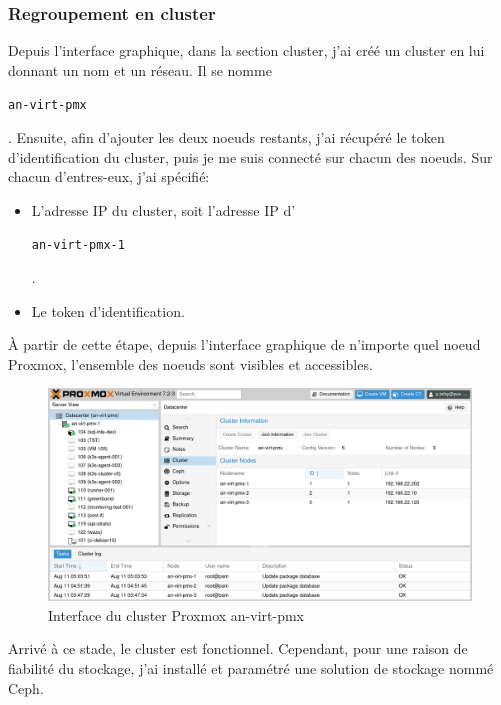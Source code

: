 \documentclass[12pt, a4paper, twoside]{article}
\begin{document}
\subsubsection{Regroupement en cluster}
Depuis l'interface graphique, dans la section \gls{cluster}, j'ai créé un \gls{cluster} en lui donnant un nom et un réseau. 
Il se nomme \begin{code}\texttt{an-virt-pmx}\end{code}.
Ensuite, afin d'ajouter les deux noeuds restants, j'ai récupéré le token d'identification du \gls{cluster}, puis je me suis connecté sur chacun des noeuds. 
Sur chacun d'entres-eux, j'ai spécifié:
\begin{itemize}
    \item L'adresse \gls{IP} du \gls{cluster}, soit l'adresse \gls{IP} d'\begin{code}\texttt{an-virt-pmx-1}\end{code}.
    \item Le token d'identification.
\end{itemize}

À partir de cette étape, depuis l'interface graphique de n'importe quel noeud \gls{Proxmox}, l'ensemble des noeuds sont visibles et accessibles.

\begin{figure}[ht!]
    \centering
        \includegraphics[width=\textwidth]{src/interface_proxmox_main.png}
    \caption{Interface du \gls{cluster} \gls{Proxmox} an-virt-pmx}
    \label{fig:proxmox_virt1}
\end{figure}

Arrivé à ce stade, le \gls{cluster} est fonctionnel. 
Cependant, pour une raison de fiabilité du stockage, j'ai installé et paramétré une solution de stockage nommé \gls{Ceph}.

\newpage
\end{document}
